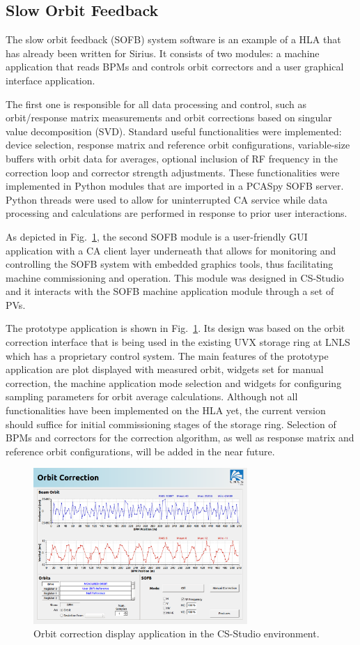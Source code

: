 \subsection{Slow Orbit Feedback}

The slow orbit feedback (SOFB) system software is an example of a HLA that has already been written for Sirius. It consists of two modules: a machine application that reads BPMs and controls orbit correctors and a user graphical interface application.

The first one is responsible for all data processing and control, such as orbit/response matrix measurements and orbit corrections based on singular value decomposition (SVD). Standard useful functionalities were implemented: device selection, response matrix and reference orbit configurations, variable-size buffers with orbit data for averages, optional inclusion of RF frequency in the correction loop and corrector strength adjustments. These functionalities were implemented in Python modules that are imported in a PCASpy SOFB server. Python threads were used to allow for uninterrupted CA service while data processing and calculations are performed in response to prior user interactions.

As depicted in Fig.~\ref{fig:sofbf1}, the second SOFB module is a user-friendly GUI application with a CA client layer underneath that allows for monitoring and controlling the SOFB system with embedded graphics tools, thus facilitating machine commissioning and operation. This module was designed in CS-Studio and it interacts with the SOFB machine application module through a set of PVs.

The prototype application is shown in Fig.~\ref{fig:sofbf1}. Its design was based on the orbit correction interface that is being used in the existing UVX storage ring at LNLS which has a proprietary control system. The main features of the prototype application are plot displayed with measured orbit, widgets set for manual correction, the machine application mode selection and widgets for configuring sampling parameters for orbit average calculations. Although not all functionalities have been implemented on the HLA yet, the current version should suffice for initial commissioning stages of the storage ring. Selection of BPMs and correctors for the correction algorithm, as well as response matrix and reference orbit configurations, will be added in the near future.

\begin{figure}[!htb]
   \centering
   \includegraphics*[width=230pt]{WEPOPRPO22f3}
   \caption{Orbit correction display application in the CS-Studio environment.}
   \label{fig:sofbf1}
\end{figure}